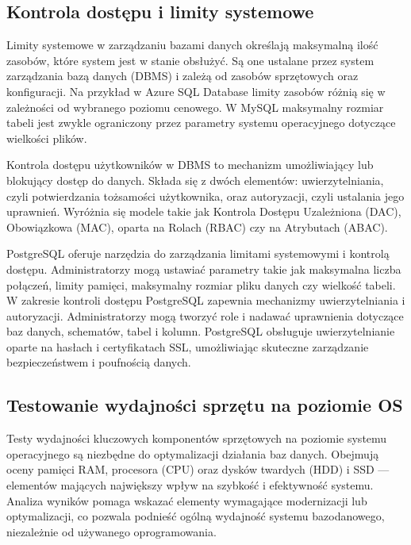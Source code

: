 \documentclass[letterpaper,10pt,polish]{sphinxmanual}
\begin{document}
\subsection{Kontrola dostępu i limity systemowe}
\label{\detokenize{rozdzial2/Wydajnosc_Skalowanie_i_Replikacja/index:kontrola-dostepu-i-limity-systemowe}}
\sphinxAtStartPar
Limity systemowe w zarządzaniu bazami danych określają maksymalną ilość zasobów, które system jest w stanie obsłużyć. Są one ustalane przez system zarządzania bazą danych (DBMS) i zależą od zasobów sprzętowych oraz konfiguracji. Na przykład w Azure SQL Database limity zasobów różnią się w zależności od wybranego poziomu cenowego. W MySQL maksymalny rozmiar tabeli jest zwykle ograniczony przez parametry systemu operacyjnego dotyczące wielkości plików.

\sphinxAtStartPar
Kontrola dostępu użytkowników w DBMS to mechanizm umożliwiający lub blokujący dostęp do danych. Składa się z dwóch elementów: uwierzytelniania, czyli potwierdzania tożsamości użytkownika, oraz autoryzacji, czyli ustalania jego uprawnień. Wyróżnia się modele takie jak Kontrola Dostępu Uzależniona (DAC), Obowiązkowa (MAC), oparta na Rolach (RBAC) czy na Atrybutach (ABAC).

\sphinxAtStartPar
PostgreSQL oferuje narzędzia do zarządzania limitami systemowymi i kontrolą dostępu. Administratorzy mogą ustawiać parametry takie jak maksymalna liczba połączeń, limity pamięci, maksymalny rozmiar pliku danych czy wielkość tabeli. W zakresie kontroli dostępu PostgreSQL zapewnia mechanizmy uwierzytelniania i autoryzacji. Administratorzy mogą tworzyć role i nadawać uprawnienia dotyczące baz danych, schematów, tabel i kolumn. PostgreSQL obsługuje uwierzytelnianie oparte na hasłach i certyfikatach SSL, umożliwiając skuteczne zarządzanie bezpieczeństwem i poufnością danych.


\subsection{Testowanie wydajności sprzętu na poziomie OS}
\label{\detokenize{rozdzial2/Wydajnosc_Skalowanie_i_Replikacja/index:testowanie-wydajnosci-sprzetu-na-poziomie-os}}
\sphinxAtStartPar
Testy wydajności kluczowych komponentów sprzętowych na poziomie systemu operacyjnego są niezbędne do optymalizacji działania baz danych. Obejmują oceny pamięci RAM, procesora (CPU) oraz dysków twardych (HDD) i SSD — elementów mających największy wpływ na szybkość i efektywność systemu. Analiza wyników pomaga wskazać elementy wymagające modernizacji lub optymalizacji, co pozwala podnieść ogólną wydajność systemu bazodanowego, niezależnie od używanego oprogramowania.
\end{document}
